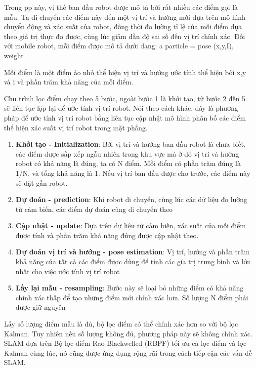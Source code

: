 Trong  pp  này,  vị thế ban đầu robot được mô tả  bởi rất nhiều các điểm gọi là mẫu.  Ta  di chuyển các điểm này  đến  một vị trí và hướng mới  dựa trên mô hình  chuyển động và xác suất của  robot,  đồng thời đo  lường  tỉ lệ  của  mỗi điểm dựa theo  giá  trị thực  đo được,  cùng lúc giảm dần  độ sai  số đến vị trí  chính xác.  Đối với mobile robot,  mỗi điểm được mô tả dưới dạng:
a  particle =  pose (x,y,I), weight

Mỗi  điểm là một điểm  ảo nhỏ  thể hiện vị trí và hướng ước  tính  thể hiện bởi x,y  và  i  và phần trăm khả năng  của mỗi điểm.

Chu trình  lọc điểm chạy theo 5  bước, ngoài bước 1  là khởi tạo,  từ bước 2  đến 5  sẽ liên tục lặp lại để ước tính vị trí robot.  Nói theo cách khác,  đây là phương pháp để ước  tính vị trí robot  bằng liên tục cập nhật mô hình phân bố các điểm  thể  hiện xác suất  vị  trí robot  trong mặt phẳng.
\begin{enumerate}
	\item \textbf{Khởi tạo  -  Initialization}:
	Bởi vị trí và hướng ban đầu  robot là  chưa biết,  các điểm được sắp xếp ngẫu nhiên trong khu vực  mà ở đó vị  trí và hướng robot có khả năng là đúng,  ta có N  điểm.  Mỗi điểm  có  phần trăm đúng là 1/N,  và  tổng  khả năng là  1.  Nếu vị trí ban đầu được cho trước,  các  điểm này sẽ đặt gần robot.
	\item \textbf{Dự đoán -  prediction}:
	Khi robot di chuyển,  cùng lúc  các dữ liệu đo lường từ cảm  biến,  các điểm dự đoán cũng di chuyển theo
	\item \textbf{Cập nhật -  update}:
	Dựa trên  dữ liệu từ cảm biến,  xác suất của mỗi điểm được  tính và phần trăm khả năng đúng được cập nhật theo.
	\item \textbf{Dự đoán  vị trí và  hướng - pose estimation}:
	Vị trí,  hướng và  phần trăm khả năng  của  tất cả  các điểm được dùng để tính các  gía trị trung bình và lớn  nhất cho việc ước tính vị trí robot
	\item \textbf{Lấy lại mẫu  -  resampling}:
	Bước này sẽ loại bỏ những điểm có khả năng  chính xác thấp  để tạo những  điểm mới  chính xác hơn. Số lượng N  điểm phải được giữ nguyên
\end{enumerate}

Lấy  số lượng điểm mẫu là đủ,  bộ lọc  điểm có thể chính xác hơn so với bộ lọc Kalman.  Tuy nhiên nếu  số lượng không đủ,  phương pháp này  sẽ không chính xác.  SLAM dựa trên  Bộ lọc điểm Rao-Blackwelled (RBPF)  tối ưu cả lọc điểm và lọc Kalman  cùng  lúc,  nó cũng  được ứng dụng rộng rãi trong  
cách tiếp cận các vấn đề SLAM.  

